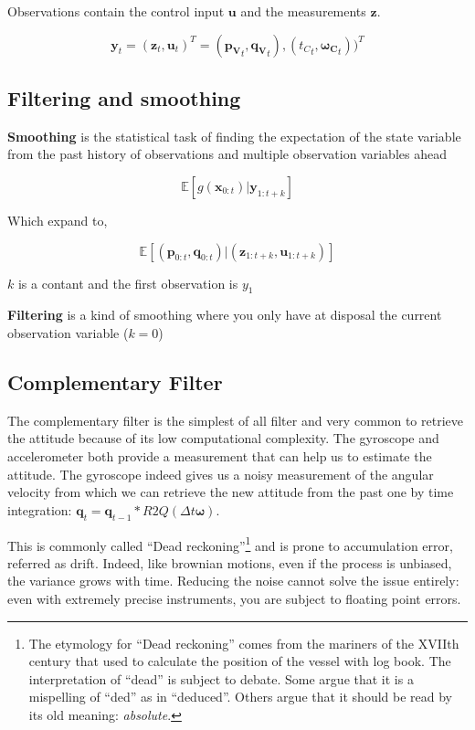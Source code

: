 \documentclass[12pt,]{article}
\begin{document}
Observations contain the control input \(\mathbf{u}\) and the
measurements \(\mathbf{z}\).

\[\mathbf{y}_t = (\mathbf{z}_t, \mathbf{u}_t)^T = (\mathbf{p_V}_t, \mathbf{q_V}_t), ({t_C}_t, \mathbf{\boldsymbol{\omega}_C}_t))^T\]

\subsection{Filtering and smoothing}\label{filtering-and-smoothing}

\textbf{Smoothing} is the statistical task of finding the expectation of
the state variable from the past history of observations and multiple
observation variables ahead

\[\mathbb{E}[g(\mathbf{x}_{0:t}) | \mathbf{y}_{1:t+k}]\]

Which expand to,

\[\mathbb{E}[(\mathbf{p}_{0:t}, \mathbf{q}_{0:t}) | (\mathbf{z}_{1:t+k}, \mathbf{u}_{1:t+k})]\]

\(k\) is a contant and the first observation is \(y_1\)

\textbf{Filtering} is a kind of smoothing where you only have at
disposal the current observation variable (\(k=0\))

\subsection{Complementary Filter}\label{complementary-filter}

The complementary filter is the simplest of all filter and very common
to retrieve the attitude because of its low computational complexity.
The gyroscope and accelerometer both provide a measurement that can help
us to estimate the attitude. The gyroscope indeed gives us a noisy
measurement of the angular velocity from which we can retrieve the new
attitude from the past one by time integration:
\(\mathbf{q}_t = \mathbf{q}_{t-1}*R2Q(\Delta t \mathbf{\omega})\).

This is commonly called ``Dead reckoning''\footnote{The etymology for
  ``Dead reckoning'' comes from the mariners of the XVIIth century that
  used to calculate the position of the vessel with log book. The
  interpretation of ``dead'' is subject to debate. Some argue that it is
  a mispelling of ``ded'' as in ``deduced''. Others argue that it should
  be read by its old meaning: \emph{absolute}.} and is prone to
accumulation error, referred as drift. Indeed, like brownian motions,
even if the process is unbiased, the variance grows with time. Reducing
the noise cannot solve the issue entirely: even with extremely precise
instruments, you are subject to floating point errors.
\end{document}
